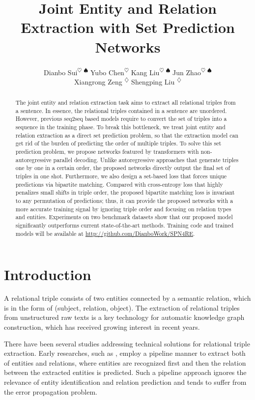 \documentclass[letterpaper]{article} \usepackage{aaai21}  \usepackage{times}  \usepackage{helvet} \usepackage{courier}  \usepackage[hyphens]{url}  \usepackage{graphicx} \usepackage{amsfonts,amssymb}
\title{Joint Entity and Relation Extraction with Set Prediction Networks}
\author {
        Dianbo Sui\textsuperscript{\rm $\heartsuit$ $\spadesuit$ }
        Yubo Chen\textsuperscript{\rm $\heartsuit$}
        Kang Liu\textsuperscript{\rm $\heartsuit$ $\spadesuit$ } 
        Jun Zhao\textsuperscript{\rm $\heartsuit$ $\spadesuit$ }  \\
        Xiangrong Zeng \textsuperscript{\rm $\diamondsuit$} Shengping Liu \textsuperscript{\rm $\diamondsuit$}\\
}
\begin{document}
\maketitle

\begin{abstract}
The joint entity and relation extraction task aims to extract all relational triples from a sentence. In essence, the relational triples contained in a sentence are unordered. However, previous seq2seq based models require to convert the set of triples into a sequence in the training phase. To break this bottleneck, we treat joint entity and relation extraction as a direct set prediction problem, so that the extraction model can get rid of the burden of predicting the order of multiple triples. To solve this set prediction problem, we propose networks featured by transformers with non-autoregressive parallel decoding. Unlike autoregressive approaches that generate triples one by one in a certain order, the proposed networks directly output the final set of triples in one shot. Furthermore, we also design a set-based loss that forces unique predictions via bipartite matching. Compared with cross-entropy loss that highly penalizes small shifts in triple order, the proposed bipartite matching loss is invariant to any permutation of predictions; thus, it can provide the proposed networks with a more accurate training signal by ignoring triple order and focusing on relation types and entities. Experiments on two benchmark datasets show that our proposed model significantly outperforms current state-of-the-art methods. Training code and trained models will be available at \url{http://github.com/DianboWork/SPN4RE}.
\end{abstract}

\section{Introduction}

A relational triple consists of two entities connected by a semantic relation, which is in the form of (subject, relation, object). The extraction of relational triples from unstructured raw texts is a key technology for automatic knowledge graph construction, which has received growing interest in recent years.

There have been several studies addressing technical solutions for relational triple extraction. Early researches, such as \citet{zelenko2003kernel,chan2011exploiting}, employ a pipeline manner to extract both of entities and relations, where entities are recognized first and then the relation between the extracted entities is predicted. Such a pipeline approach ignores the relevance of entity identification and relation prediction \cite{li2014incremental} and tends to suffer from the error propagation problem. 
\end{document}
